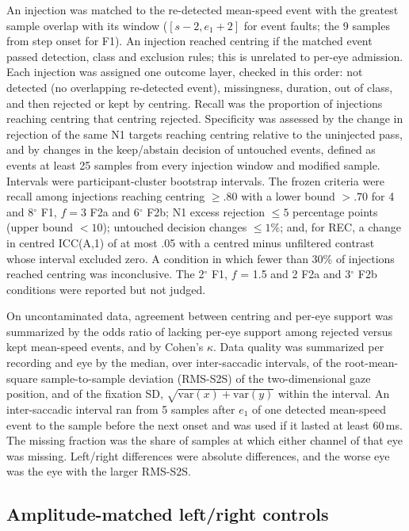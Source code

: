 An injection was matched to the re-detected mean-speed event with the greatest sample overlap with its window ($[s-2, e_1+2]$ for event faults; the 9 samples from step onset for F1). An injection reached centring if the matched event passed detection, class and exclusion rules; this is unrelated to per-eye admission. Each injection was assigned one outcome layer, checked in this order: not detected (no overlapping re-detected event), missingness, duration, out of class, and then rejected or kept by centring. Recall was the proportion of injections reaching centring that centring rejected. Specificity was assessed by the change in rejection of the same N1 targets reaching centring relative to the uninjected pass, and by changes in the keep/abstain decision of untouched events, defined as events at least 25 samples from every injection window and modified sample. Intervals were participant-cluster bootstrap intervals. The frozen criteria were recall among injections reaching centring $\ge .80$ with a lower bound $> .70$ for 4 and 8$^\circ$ F1, $f = 3$ F2a and 6$^\circ$ F2b; N1 excess rejection $\le 5$ percentage points (upper bound $< 10$); untouched decision changes $\le 1\%$; and, for REC, a change in centred ICC(A,1) of at most .05 with a centred minus unfiltered contrast whose interval excluded zero. A condition in which fewer than 30\% of injections reached centring was inconclusive. The 2$^\circ$ F1, $f$ = 1.5 and 2 F2a and 3$^\circ$ F2b conditions were reported but not judged.

On uncontaminated data, agreement between centring and per-eye support was summarized by the odds ratio of lacking per-eye support among rejected versus kept mean-speed events, and by Cohen's $\kappa$. Data quality was summarized per recording and eye by the median, over inter-saccadic intervals, of the root-mean-square sample-to-sample deviation (RMS-S2S) of the two-dimensional gaze position, and of the fixation SD, $\sqrt{\mathrm{var}(x)+\mathrm{var}(y)}$ within the interval. An inter-saccadic interval ran from 5 samples after $e_1$ of one detected mean-speed event to the sample before the next onset and was used if it lasted at least 60\,ms. The missing fraction was the share of samples at which either channel of that eye was missing. Left/right differences were absolute differences, and the worse eye was the eye with the larger RMS-S2S.

\subsection{Amplitude-matched left/right controls}


